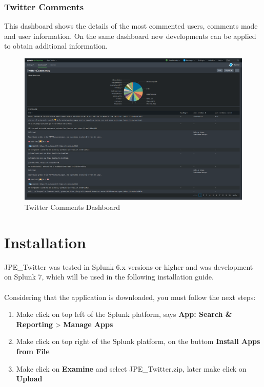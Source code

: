 \documentclass[report]{article}
\begin{document}
\newpage

\subsubsection{Twitter Comments}
This dashboard shows the details of the most commented users, comments made and user information. On the same dashboard new developments can be applied to obtain additional information.
\newline
\begin{figure}[h!]
	\centering
	\includegraphics[scale=0.2]{img/comments.png}
	\caption{\color{text}Twitter Comments Dashboard}
\end{figure}

\newpage

\section{Installation}
 
JPE\_Twitter was tested in Splunk 6.x versions or higher and was development on Splunk 7, which will be used in the following installation guide.\\
\\
Considering that the application is downloaded, you must follow the next steps:
\newline
\begin{enumerate}[label=(\alph*)]
\item Make click on top left of the Splunk platform, says \textbf{App: Search \& Reporting} > \textbf{Manage Apps}
\item Make click on top right of the Splunk platform, on the buttom \textbf{Install Apps from File}
\item Make click on \textbf{Examine} and select JPE\_Twitter.zip, later make click on \textbf{Upload}
\newline
\end{enumerate}
\end{document}
